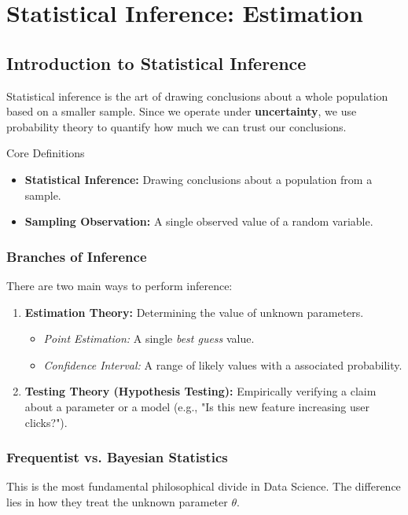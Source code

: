 \section{Statistical Inference: Estimation}

\subsection{Introduction to Statistical Inference}
Statistical inference is the art of drawing conclusions about a whole population based on a smaller sample. Since we operate under \textbf{uncertainty}, we use probability theory to quantify how much we can trust our conclusions.

\begin{defbox}{Core Definitions}
\begin{itemize}
    \item \textbf{Statistical Inference:} Drawing conclusions about a population from a sample.
    \item \textbf{Sampling Observation:} A single observed value of a random variable.
\end{itemize}
\end{defbox}


\subsubsection{Branches of Inference}
There are two main ways to perform inference:
\begin{enumerate}
    \item \textbf{Estimation Theory:} Determining the value of unknown parameters.
    \begin{itemize}
        \item \textit{Point Estimation:} A single \textit{best guess} value.
        \item \textit{Confidence Interval:} A range of likely values with a associated probability.
    \end{itemize}
    \item \textbf{Testing Theory (Hypothesis Testing):} Empirically verifying a claim about a parameter or a model (e.g., "Is this new feature increasing user clicks?").
\end{enumerate}

\subsubsection{Frequentist vs. Bayesian Statistics}
This is the most fundamental philosophical divide in Data Science. The difference lies in how they treat the unknown parameter $\theta$.

